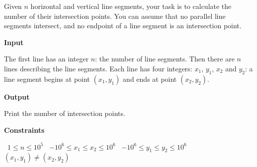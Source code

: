 Given $n$ horizontal and vertical line segments, your task is to calculate the number of their intersection points.
You can assume that no parallel line segments intersect, and no endpoint of a line segment is an intersection point.

\vspace{0.3cm}\noindent\textbf{Input}

The first line has an integer $n$: the number of line segments.
Then there are $n$ lines describing the line segments. Each line has four integers: $x_1$, $y_1$, $x_2$ and $y_2$: a line segment begins at point $(x_1,y_1)$ and ends at point $(x_2,y_2)$.

\vspace{0.3cm}\noindent\textbf{Output}

Print the number of intersection points.

\vspace{0.3cm}\noindent\textbf{Constraints}

\textbullet\ $1 \le n \le 10^5$
\textbullet\ $-10^6 \le x_1 \le x_2 \le 10^6$
\textbullet\ $-10^6 \le y_1 \le y_2 \le 10^6$
\textbullet\ $(x_1,y_1) \neq (x_2,y_2)$